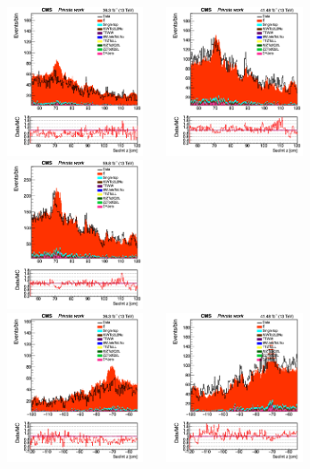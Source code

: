 \documentclass{cernatlasnote}
\begin{document}
\begin{figure}[htp]
\centering
\includegraphics[width=4.6cm, height=4.4cm]{images/emu_channel/2016/16_Plots_for_r_z/SecInt_z_Selec_eta_z_plus_55_120_Linear.png}
\includegraphics[width=4.6cm, height=4.4cm]{images/emu_channel/2017/17_Plots_for_r_z/SecInt_z_Selec_eta_plus_55_120_Linear.png}
 \includegraphics[width=4.6cm, height=4.4cm]{images/emu_channel/2018/18_Plots_for_r_z/SecInt_z_Selec_eta_z_55_120_Linear.png}\\
 \includegraphics[width=4.6cm, height=4.4cm]{images/emu_channel/2016/16_Plots_for_r_z/SecInt_z_Selec_eta_z_minus_55_120_Linear.png}
\includegraphics[width=4.6cm, height=4.4cm]{images/emu_channel/2017/17_Plots_for_r_z/SecInt_z_Selec_eta_minus_55_120_Linear.png}

\end{figure}
\end{document}
